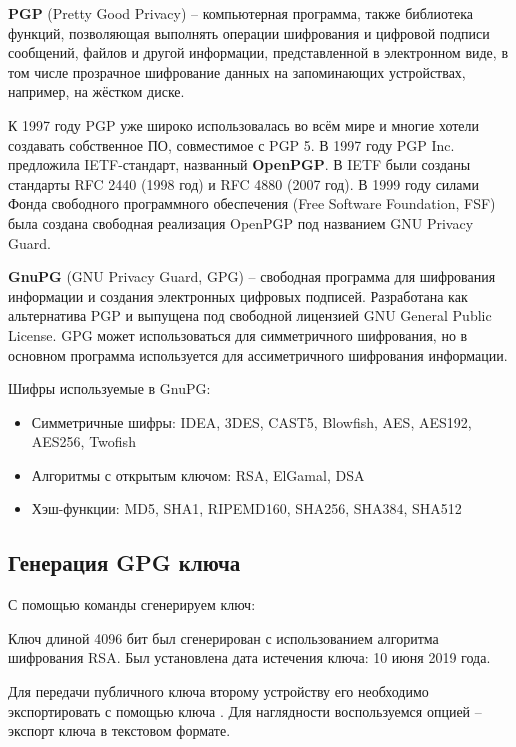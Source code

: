 \textbf{PGP} (Pretty Good Privacy) -- компьютерная программа, также библиотека функций, позволяющая выполнять операции шифрования и цифровой подписи сообщений, файлов и другой информации, представленной в электронном виде, в том числе прозрачное шифрование данных на запоминающих устройствах, например, на жёстком диске.

К 1997 году PGP уже широко использовалась во всём мире и многие хотели создавать собственное ПО, совместимое с PGP 5. В 1997 году PGP Inc. предложила IETF-стандарт, названный \textbf{OpenPGP}. В IETF были созданы стандарты RFC 2440 (1998 год) и RFC 4880 (2007 год). В 1999 году силами Фонда свободного программного обеспечения (Free Software Foundation, FSF) была создана свободная реализация OpenPGP под названием GNU Privacy Guard.

\textbf{GnuPG} (GNU Privacy Guard, GPG) -- свободная программа для шифрования информации и создания электронных цифровых подписей. Разработана как альтернатива PGP и выпущена под свободной лицензией GNU General Public License. GPG может использоваться для симметричного шифрования, но в основном программа используется для ассиметричного шифрования информации.

Шифры используемые в GnuPG:

\begin{itemize}
	\item Симметричные шифры: IDEA, 3DES, CAST5, Blowfish, AES, AES192, AES256, Twofish
	\item Алгоритмы с открытым ключом: RSA, ElGamal, DSA
	\item Хэш-функции: MD5, SHA1, RIPEMD160, SHA256, SHA384, SHA512
\end{itemize}

\subsection{Генерация GPG ключа}

С помощью команды  сгенерируем ключ:



Ключ длиной 4096 бит был сгенерирован с использованием алгоритма шифрования RSA. Был установлена дата истечения ключа: 10 июня 2019 года.

Для передачи публичного ключа второму устройству его необходимо экспортировать с помощью ключа . Для наглядности воспользуемся опцией  -- экспорт ключа в текстовом формате.

